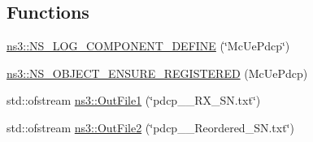 \subsection*{Functions}
\begin{DoxyCompactItemize}
\item 
\hyperlink{namespacens3_a66cdd5c7334b1de8e09ef6556fa88a8c}{ns3\+::\+N\+S\+\_\+\+L\+O\+G\+\_\+\+C\+O\+M\+P\+O\+N\+E\+N\+T\+\_\+\+D\+E\+F\+I\+NE} (\char`\"{}Mc\+Ue\+Pdcp\char`\"{})
\item 
\hyperlink{namespacens3_a24b0845545f77db65da73f5b112f8290}{ns3\+::\+N\+S\+\_\+\+O\+B\+J\+E\+C\+T\+\_\+\+E\+N\+S\+U\+R\+E\+\_\+\+R\+E\+G\+I\+S\+T\+E\+R\+ED} (Mc\+Ue\+Pdcp)
\item 
std\+::ofstream \hyperlink{namespacens3_a92f6c16254f067e3247ea33a7ada3444}{ns3\+::\+Out\+File1} (\char`\"{}pdcp\+\_\+\_\+\+R\+X\+\_\+\+S\+N.\+txt\char`\"{})
\item 
std\+::ofstream \hyperlink{namespacens3_a9b97de465779b1ad6d6147991dd9cde7}{ns3\+::\+Out\+File2} (\char`\"{}pdcp\+\_\+\_\+\+Reordered\+\_\+\+S\+N.\+txt\char`\"{})
\end{DoxyCompactItemize}
